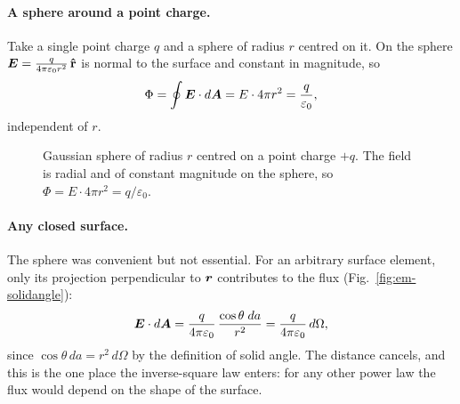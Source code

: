 \paragraph{A sphere around a point charge.} Take a single point charge $q$ and a sphere of radius $r$ centred on it. On the sphere $\vect{E} = \frac{q}{4\pi\varepsilon_0 r^2}\,\rhat$ is normal to the surface and constant in magnitude, so
\[
    \Phi = \oint \vect{E}\cdot d\vect{A} = E\cdot 4\pi r^2 = \frac{q}{\varepsilon_0},
\]
independent of $r$.

\begin{figure}[H]
\centering
{}
\caption{Gaussian sphere of radius $r$ centred on a point charge $+q$. The field is radial and of constant magnitude on the sphere, so $\Phi = E\cdot 4\pi r^2 = q/\varepsilon_0$.}
\end{figure}

\paragraph{Any closed surface.} The sphere was convenient but not essential. For an arbitrary surface element, only its projection perpendicular to $\bm{r}$ contributes to the flux (Fig.~\ref{fig:em-solidangle}):
\[
    \vect{E}\cdot d\vect{A} = \frac{q}{4\pi\varepsilon_0}\,\frac{\cos\theta\; da}{r^2} = \frac{q}{4\pi\varepsilon_0}\,d\Omega ,
\]
since $\cos\theta\,da = r^2\,d\Omega$ by the definition of solid angle. The distance cancels, and this is the one place the inverse-square law enters: for any other power law the flux would depend on the shape of the surface.


